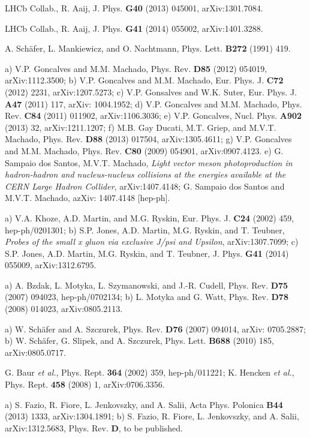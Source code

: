 \documentclass[12pt]{article}
\begin{document}
\begin{thebibliography}{99}
 LHCb Collab., R. Aaij, J. Phys. {\bf G40} (2013) 045001, arXiv:1301.7084.

  LHCb Collab., R. Aaij, J. Phys. {\bf G41} (2014) 055002, arXiv:1401.3288.

 A. Sch\"afer, L. Mankiewicz, and O. Nachtmann, Phys. Lett. {\bf B272} (1991) 419.

 a) V.P. Goncalves and M.M. Machado, Phys. Rev. {\bf D85} (2012) 054019, arXiv:1112.3500;
b) V.P. Goncalves and M.M. Machado, Eur. Phys. J. {\bf C72} (2012) 2231, arXiv:1207.5273; c) V.P. Gonsalves and W.K. Suter, Eur. Phys. J. {\bf A47} (2011) 117,
arXiv: 1004.1952;
d) V.P. Goncalves and M.M. Machado, Phys. Rev. {\bf C84} (2011) 011902, arXiv:1106.3036; e) V.P. Goncalves, Nucl. Phys. {\bf A902} (2013) 32,  
arXiv:1211.1207; f) M.B. Gay Ducati, M.T. Griep, and M.V.T. Machado, Phys. Rev. {\bf D88} (2013) 017504, arXiv:1305.4611;
g) V.P. Goncalves and M.M. Machado, Phys. Rev. {\bf C80} (2009) 054901, arXiv:0907.4123.
e)  G. Sampaio dos Santos, M.V.T. Machado, {\it Light vector meson photoproduction in hadron-hadron and nucleus-nucleus collisions at the energies available at the CERN Large Hadron Collider}, arXiv:1407.4148; G. Sampaio dos Santos and M.V.T. Machado, azXiv: 1407.4148 [hep-ph].

 a) V.A. Khoze, A.D. Martin, and M.G. Ryskin, Eur. Phys. J. {\bf C24} (2002) 459, hep-ph/0201301;
b) S.P. Jones, A.D. Martin, M.G. Ryskin, and T. Teubner, {\it Probes of the small x gluon via exclusive J/psi and Upsilon}, arXiv:1307.7099;
c) S.P. Jones, A.D. Martin, M.G. Ryskin, and T. Teubner,  J. Phys. {\bf G41} (2014) 055009, arXiv:1312.6795.

 a) A. Bzdak,  L. Motyka, L. Szymanowski, and J.-R. Cudell, Phys. Rev. {\bf D75} (2007) 094023, hep-ph/0702134; 
b) L. Motyka and G. Watt, Phys. Rev. {\bf D78} (2008) 014023, arXiv:0805.2113.

 a) W. Sch\"afer and A. Szczurek, Phys. Rev. {\bf D76} (2007) 094014, arXiv: 0705.2887; b) W. Sch\"afer, G. Slipek, and A. Szczurek,
Phys. Lett. {\bf B688} (2010) 185, arXiv:0805.0717.


 G. Baur {\it et al.}, Phys. Rept. {\bf 364} (2002) 359, hep-ph/011221; K. Hencken {\it et al.}, Phys. Rept. {\bf 458} (2008) 1, arXiv:0706.3356.

 a) S. Fazio, R. Fiore, L. Jenkovszky, and A. Salii, Acta Phys. Polonica {\bf B44} (2013) 1333, arXiv:1304.1891; b) S. Fazio, R. Fiore, L. Jenkovszky, and A. Salii, 
arXiv:1312.5683, Phys. Rev. {\bf D}, to be published. 


\end{thebibliography}
\end{document}
